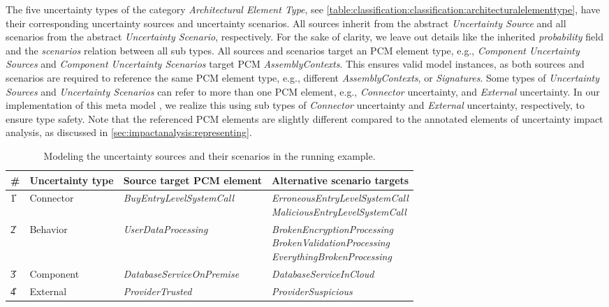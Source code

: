 The five uncertainty types of the category \emph{Architectural Element Type}, see \autoref{table:classification:classification:architecturalelementtype}, have their corresponding uncertainty sources and uncertainty scenarios.
All sources inherit from the abstract \emph{Uncertainty Source} and all scenarios from the abstract \emph{Uncertainty Scenario}, respectively.
For the sake of clarity, we leave out details like the inherited \emph{probability} field and the \emph{scenarios} relation between all sub types.
All sources and scenarios target an \ac{PCM} element type, e.g., \emph{Component Uncertainty Sources} and \emph{Component Uncertainty Scenarios} target \ac{PCM} \emph{AssemblyContexts}.
This ensures valid model instances, as both sources and scenarios are required to reference the same \ac{PCM} element type, e.g., different \emph{AssemblyContexts}, or \emph{Signatures}.
Some types of \emph{Uncertainty Sources} and \emph{Uncertainty Scenarios} can refer to more than one \ac{PCM} element, e.g., \emph{Connector} uncertainty, and \emph{External} uncertainty.
In our implementation of this meta model \cite{dataset}, we realize this using sub types of \emph{Connector} uncertainty and \emph{External} uncertainty, respectively, to ensure type safety.
Note that the referenced \ac{PCM} elements are slightly different compared to the annotated elements of uncertainty impact analysis, as discussed in \autoref{sec:impactanalysis:representing}.

\begin{table}
    \begin{tabularx}{\linewidth}{lllX}
        \toprule
        \# & Uncertainty type & Source target \ac{PCM} element & Alternative scenario targets \\
        \midrule
        \U{1} & Connector & \emph{BuyEntryLevelSystemCall} & 
            \mtl{\emph{ErroneousEntryLevelSystemCall}\\\emph{MaliciousEntryLevelSystemCall}} \\
        \U{2} & Behavior & \emph{UserDataProcessing} & 
            \mtl{\emph{BrokenEncryptionProcessing}\\\emph{BrokenValidationProcessing}\\\emph{EverythingBrokenProcessing}} \\
        \U{3} & Component & \emph{DatabaseServiceOnPremise} & \emph{DatabaseServiceInCloud} \\
        \U{4} & External & \emph{ProviderTrusted} & \emph{ProviderSuspicious} \\
        \bottomrule
    \end{tabularx}
    \caption{Modeling the uncertainty sources and their scenarios in the running example.}%
    \label{table:confidentialityanalysis:uncertaintymodelrunningexample}
\end{table}

